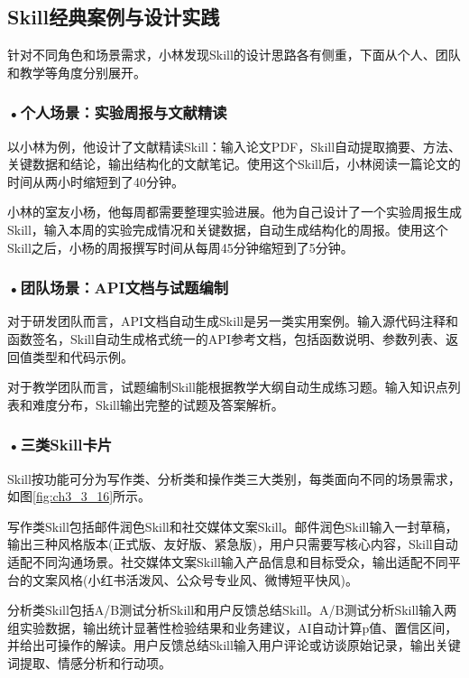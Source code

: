 \subsection{Skill经典案例与设计实践}

针对不同角色和场景需求，小林发现Skill的设计思路各有侧重，下面从个人、团队和教学等角度分别展开。
\subsubsection*{\textbf{•个人场景：实验周报与文献精读}}
以小林为例，他设计了文献精读Skill：输入论文PDF，Skill自动提取摘要、方法、关键数据和结论，输出结构化的文献笔记。使用这个Skill后，小林阅读一篇论文的时间从两小时缩短到了40分钟。

小林的室友小杨，他每周都需要整理实验进展。他为自己设计了一个实验周报生成Skill，输入本周的实验完成情况和关键数据，自动生成结构化的周报。使用这个Skill之后，小杨的周报撰写时间从每周45分钟缩短到了5分钟。


\subsubsection*{\textbf{•团队场景：API文档与试题编制}}
对于研发团队而言，API文档自动生成Skill是另一类实用案例。输入源代码注释和函数签名，Skill自动生成格式统一的API参考文档，包括函数说明、参数列表、返回值类型和代码示例。



对于教学团队而言，试题编制Skill能根据教学大纲自动生成练习题。输入知识点列表和难度分布，Skill输出完整的试题及答案解析。




\subsubsection*{\textbf{•三类Skill卡片}}

Skill按功能可分为写作类、分析类和操作类三大类别，每类面向不同的场景需求，如图\ref{fig:ch3_3_16}所示。

写作类Skill包括邮件润色Skill和社交媒体文案Skill。邮件润色Skill输入一封草稿，输出三种风格版本(正式版、友好版、紧急版)，用户只需要写核心内容，Skill自动适配不同沟通场景。社交媒体文案Skill输入产品信息和目标受众，输出适配不同平台的文案风格(小红书活泼风、公众号专业风、微博短平快风)。



分析类Skill包括A/B测试分析Skill和用户反馈总结Skill。A/B测试分析Skill输入两组实验数据，输出统计显著性检验结果和业务建议，AI自动计算p值、置信区间，并给出可操作的解读。用户反馈总结Skill输入用户评论或访谈原始记录，输出关键词提取、情感分析和行动项。



